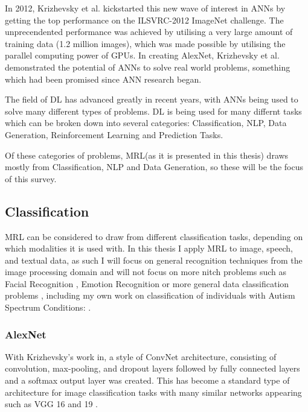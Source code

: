 In 2012, Krizhevsky et al. \cite{krizhevsky2012imagenet} kickstarted this new wave of interest in \acp{ANN} by getting the top performance on the ILSVRC-2012 ImageNet challenge. The unprecendented performance was achieved by utilising a very large amount of training data (1.2 million images), which was made possible by utilising the parallel computing power of \acp{GPU}. In creating AlexNet, Krizhevsky et al. demonstrated the potential of \acp{ANN} to solve real world problems, something which had been promised since \ac{ANN} research began.

The field of \ac{DL} has advanced greatly in recent years, with \acp{ANN} being used to solve many different types of problems. \ac{DL} is being used for many differnt tasks which can be broken down into several categories: Classification, \ac{NLP}, Data Generation, Reinforcement Learning \cite{vinyals2019alphastar} and Prediction Tasks.


Of these categories of problems, \ac{MRL}(as it is presented in this thesis) draws mostly from Classification, \ac{NLP} and Data Generation, so these will be the focus of this survey.

\subsection{Classification}
\ac{MRL} can be considered to draw from different classification tasks, depending on which modalities it is used with. In this thesis I apply \ac{MRL} to image, speech, and textual data, as such I will focus on general recognition techniques from the image processing domain and will not focus on more nitch problems such as Facial Recognition \cite{ma2004facial}, Emotion Recognition \cite{levi2015emotion} or more general data classification problems \cite{kussul2017deep,qi2017pointnet}, including my own work on classification of individuals with Autism Spectrum Conditions: \cite{lohan2016distinguishing, sheppard2017understanding, lohan2018toward}.

\subsubsection{AlexNet}
With Krizhevsky's work in\cite{krizhevsky2012imagenet}, a style of \ac{ConvNet} architecture, consisting of convolution, max-pooling, and dropout layers followed by fully connected layers and a softmax output layer was created. This has become a standard type of architecture for image classification tasks with many similar networks appearing such as VGG 16 and 19 \cite{simonyan2014very}.

